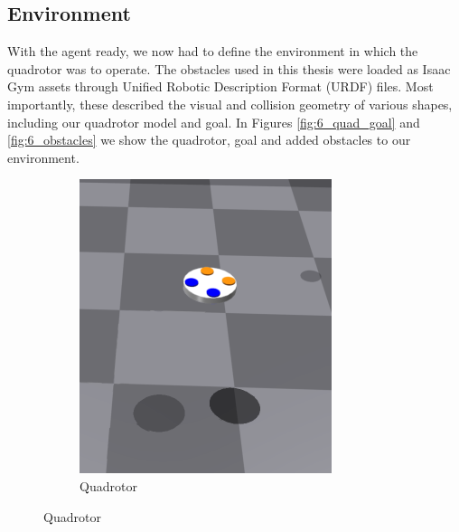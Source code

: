 \subsection{Environment}
With the agent ready, we now had to define the environment in which the quadrotor was to operate. The obstacles used in this thesis were loaded as Isaac Gym assets through Unified Robotic Description Format (URDF) files. Most importantly, these described the visual and collision geometry of various shapes, including our quadrotor model and goal. 
In Figures \ref{fig:6_quad_goal} and \ref{fig:6_obstacles} we show the quadrotor, goal and added obstacles to our environment.
\begin{figure}[H]
     \centering
     \hspace{0.04\textwidth}
     \begin{subfigure}[b]{0.3\textwidth}
         \centering
         \captionsetup{justification=centering}
         \includegraphics[width=\textwidth]{figures/6_/6_quadrotor.png}
         \caption{Quadrotor}
         \label{fig:6_quadrotor}
     \end{subfigure} 
     \hspace{0.15\textwidth}

\end{figure}
